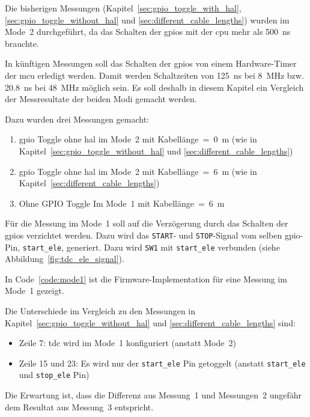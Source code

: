 Die bisherigen Messungen (Kapitel~\ref{sec:gpio_toggle_with_hal}, \ref{sec:gpio_toggle_without_hal} und
\ref{sec:different_cable_lengths}) wurden im Mode~2 durchgeführt, da das Schalten der \acrshort{gpio}s mit der
\acrshort{cpu} mehr als 500~ns brauchte.

In künftigen Messungen soll das Schalten der \acrshort{gpio}s von einem Hardware-Timer der \acrshort{mcu} erledigt
werden. Damit werden Schaltzeiten von 125~ns bei 8~MHz bzw. 20.8~ns bei 48~MHz möglich sein. Es soll deshalb in diesem
Kapitel ein Vergleich der Messresultate der beiden Modi gemacht werden.

Dazu wurden drei Messungen gemacht:
\begin{enumerate}
    \item \acrshort{gpio} Toggle ohne \acrshort{hal} im Mode~2 mit Kabellänge~=~0~m (wie in Kapitel~\ref{sec:gpio_toggle_without_hal} und \ref{sec:different_cable_lengths})
    \item \acrshort{gpio} Toggle ohne \acrshort{hal} im Mode~2 mit Kabellänge~=~6~m (wie in Kapitel~\ref{sec:different_cable_lengths})
    \item Ohne GPIO Toggle Im Mode~1 mit Kabellänge~=~6~m
\end{enumerate}

Für die Messung im Mode~1 soll auf die Verzögerung durch das Schalten der \acrshort{gpio}s verzichtet werden. Dazu wird
das \lstinline|START|- und \lstinline|STOP|-Signal vom selben \acrshort{gpio}-Pin, \lstinline|start_ele|, generiert.
Dazu wird \lstinline|SW1| mit \lstinline|start_ele| verbunden (siehe Abbildung~\ref{fig:tdc_ele_signal}).

In Code~\ref{code:mode1} ist die Firmware-Implementation für eine Messung im Mode~1 gezeigt.



Die Unterschiede im Vergleich zu den Messungen in Kapitel~\ref{sec:gpio_toggle_without_hal} und
\ref{sec:different_cable_lengths} sind:

\begin{itemize}
    \item Zeile 7: \acrshort{tdc} wird im Mode~1 konfiguriert (anstatt Mode~2)
    \item Zeile 15 und 23: Es wird nur der \lstinline|start_ele| Pin getoggelt (anstatt \lstinline|start_ele| und \lstinline|stop_ele| Pin)
\end{itemize}

Die Erwartung ist, dass die Differenz aus Messung~1 und Messungen~2 ungefähr dem Resultat aus Messung~3 entspricht.

